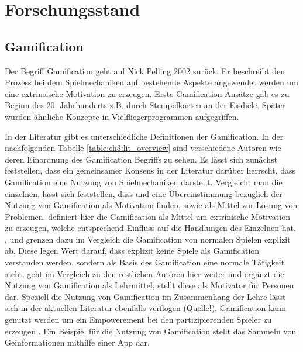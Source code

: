 \chapter{Forschungsstand}
\label{ch3:Forschungsstand}

\section{Gamification}
\label{ch3:s:Gamification}

Der Begriff Gamification geht auf Nick Pelling 2002 zurück.
Er beschreibt den Prozess bei dem Spielmechaniken auf bestehende Aspekte angewendet werden um eine extrinsische Motivation zu erzeugen.\citep{Marczewski.2013}
Erste Gamification Ansätze gab es zu Beginn des 20. Jahrhunderts z.B. durch Stempelkarten an der Eisdiele. Später wurden ähnliche Konzepte in Vielfliegerprogrammen aufgegriffen.

In der Literatur gibt es unterschiedliche Definitionen der Gamification.
In der nachfolgenden Tabelle \ref{table:ch3:lit_overview} sind verschiedene Autoren wie deren Einordnung des Gamification Begriffs zu sehen.
Es lässt sich zunächst feststellen, dass ein gemeinsamer Konsens in der Literatur darüber herrscht, dass Gamification eine Nutzung von Spielmechaniken darstellt.
Vergleicht man die einzelnen, lässt sich feststellen, dass \cite{Zichermann.2011} und \cite{Kapp.2012} eine Übereinstimmung bezüglich der Nutzung von Gamification als Motivation finden, sowie als Mittel zur Lösung von Problemen. \cite{Zichermann.2011} definiert hier die Gamification als Mittel um extrinische Motivation zu erzeugen, welche entsprechend Einfluss auf die Handlungen des Einzelnen hat.
\cite{Deterding.2011}, \cite{Breuer.2011} und \cite{Oxford.2013} grenzen dazu im Vergleich die Gamification von normalen Spielen explizit ab. Diese legen Wert darauf, dass explizit keine Spiele als Gamification verstanden werden, sondern als Basis des Gamification eine normale Tätigkeit steht.
\cite{Kapp.2012} geht im Vergleich zu den restlichen Autoren hier weiter und ergänzt die Nutzung von Gamification als Lehrmittel, stellt diese als Motivator für Personen dar. Speziell die Nutzung von Gamification im Zusammenhang der Lehre lässt sich in der aktuellen Literatur ebenfalls verflogen (Quelle!).
Gamification kann genutzt werden um ein Empowerement bei den partizipierenden Spieler zu erzeugen \cite{Jeannerod.2003}. 
Ein Beispiel für die Nutzung von Gamification stellt das Sammeln von Geinformationen mithilfe einer App dar. \citep{Odobasic.2013}

